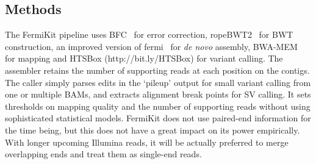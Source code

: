 \documentclass{bioinfo}
\begin{document}
\begin{methods}
\section{Methods}
The FermiKit pipeline uses BFC~\citep{Li:2015aa-tmp} for error correction,
ropeBWT2~\citep{Li:2014ab} for BWT construction, an improved version of
fermi~\citep{Li:2012fk} for {\it de novo} assembly, BWA-MEM~\citep{Li:2013aa}
for mapping and HTSBox (http://bit.ly/HTSBox) for variant calling. The
assembler retains the number of supporting reads at each position on the
contigs. The caller simply parses edits in the `pileup' output for small
variant calling from one or multiple BAMs, and extracts alignment break points
for SV calling. It sets thresholds on mapping quality and the number of
supporting reads without using sophisticated statistical models. FermiKit
does not use paired-end information for the time being, but this does not have
a great impact on its power empirically. With longer upcoming Illumina reads,
it will be actually preferred to merge overlapping ends and treat them as
single-end reads.

\end{methods}
\end{document}
